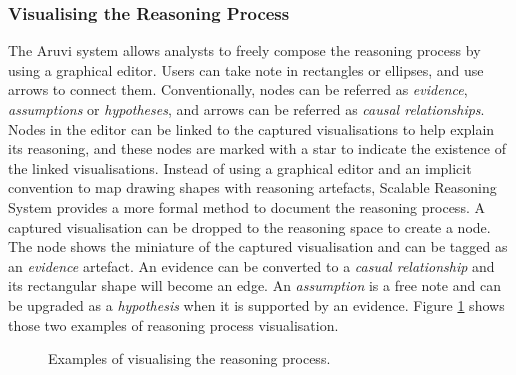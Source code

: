 \subsubsection{Visualising the Reasoning Process}
\label{sub:reasoningprocess}
The Aruvi system \cite{Shrinivasan2008} allows analysts to freely compose the reasoning process by using a graphical editor. Users can take note in rectangles or ellipses, and use arrows to connect them. Conventionally, nodes can be referred as \textit{evidence}, \textit{assumptions} or \textit{hypotheses}, and arrows can be referred as \textit{causal relationships}. Nodes in the editor can be linked to the captured visualisations to help explain its reasoning, and these nodes are marked with a star to indicate the existence of the linked visualisations. Instead of using a graphical editor and an implicit convention to map drawing shapes with reasoning artefacts, Scalable Reasoning System \cite{Pike2009a} provides a more formal method to document the reasoning process. A captured visualisation can be dropped to the reasoning space to create a node. The node shows the miniature of the captured visualisation and can be tagged as an \textit{evidence} artefact. An evidence can be converted to a \textit{casual relationship} and its rectangular shape will become an edge. An \textit{assumption} is a free note and can be upgraded as a \textit{hypothesis} when it is supported by an evidence. Figure \ref{fig:ReasoningDocumenting} shows those two examples of reasoning process visualisation.

\begin{figure}[ht]
\centering
{} \hspace{0.1cm}
\caption{Examples of visualising the reasoning process.}
\label{fig:ReasoningDocumenting}
\end{figure}


